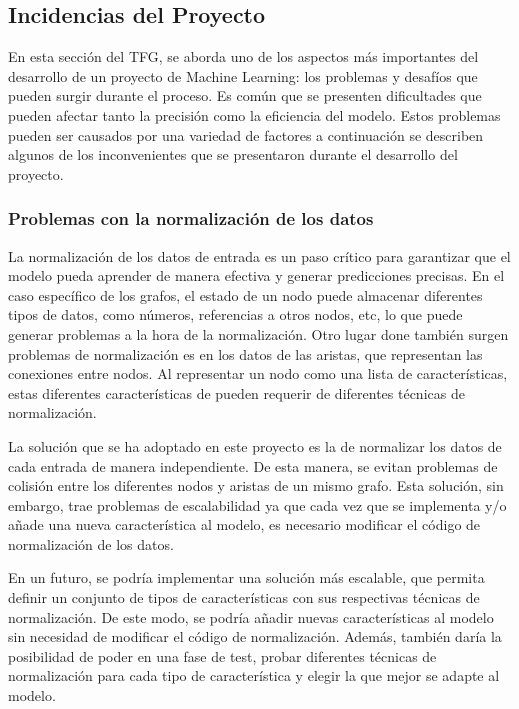 \subsection{Incidencias del Proyecto}
En esta sección del TFG, se aborda uno de los aspectos más importantes del desarrollo 
de un proyecto de Machine Learning: los problemas y desafíos que pueden surgir durante 
el proceso. Es común que se presenten dificultades que pueden afectar tanto la precisión 
como la eficiencia del modelo. Estos problemas pueden ser causados por una variedad 
de factores a continuación se describen algunos de los inconvenientes que se presentaron
durante el desarrollo del proyecto.

\subsubsection{Problemas con la normalización de los datos}
La normalización de los datos de entrada es un paso crítico para garantizar que el 
modelo pueda aprender de manera efectiva y generar predicciones precisas. En el caso 
específico de los grafos, el estado de un nodo puede almacenar diferentes tipos de datos, 
como números, referencias a otros nodos, etc, lo que puede generar problemas a la hora 
de la normalización. Otro lugar done también surgen problemas de normalización es en los 
datos de las aristas, que representan las conexiones entre nodos. Al representar un 
nodo como una lista de características, estas diferentes características de pueden 
requerir de diferentes técnicas de normalización.\medskip

La solución que se ha adoptado en este proyecto es la de normalizar los datos de
cada entrada de manera independiente. De esta manera, se evitan problemas de colisión 
entre los diferentes nodos y aristas de un mismo grafo. Esta solución, sin embargo,
trae problemas de escalabilidad ya que cada vez que se implementa y/o añade una nueva
característica al modelo, es necesario modificar el código de normalización de los datos.\medskip

En un futuro, se podría implementar una solución más escalable, que permita definir
un conjunto de tipos de características con sus respectivas técnicas de normalización.
De este modo, se podría añadir nuevas características al modelo sin necesidad de
modificar el código de normalización. Además, también daría la posibilidad de
poder en una fase de test, probar diferentes técnicas de normalización para
cada tipo de característica y elegir la que mejor se adapte al modelo.

